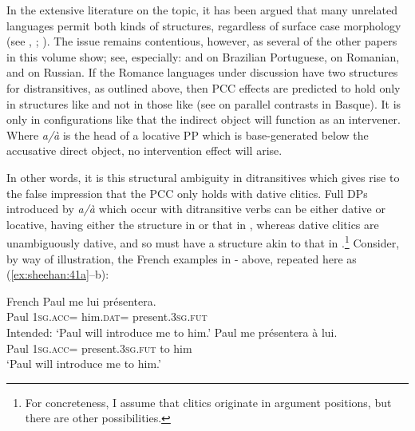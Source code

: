 \documentclass[output=paper,colorlinks,citecolor=brown,nonflat]{langsci/langscibook}
\begin{document}
In the extensive literature on the topic, it has been argued that many unrelated languages permit both kinds of structures, regardless of surface case morphology (see \citealt{Marantz1993, Pesetsky1995, Cuervo2003, Anagnostopoulou2003, Pylkkänen2002}, \citeyear{Pylkkänen2008}; \citealt{MiyagawaTsujioka2004, Bruening2010DOC, HarleyMiyagawa2017}). The issue remains contentious, however, as several of the other papers in this volume show; see, especially:  and  on Brazilian Portuguese,  on Romanian, and  on Russian. If the Romance languages under discussion have two structures for distransitives, as outlined above, then PCC effects are predicted to hold only in structures like  and not in those like  (see \citealt{Rezac2008} on parallel contrasts in Basque). It is only in configurations like  that the indirect object will function as an intervener. Where \textit{a/à} is the head of a locative PP which is base-generated below the accusative direct object, no intervention effect will arise.

In other words, it is this structural ambiguity in ditransitives which gives rise to the false impression that the PCC only holds with dative clitics. Full DPs introduced by \textit{a/à} which occur with ditransitive verbs can be either dative or locative, having either the structure in  or that in , whereas dative clitics are unambiguously dative, and so must have a structure akin to that in .\footnote{For concreteness, I assume that clitics originate in argument positions, but there are other possibilities.} Consider, by way of illustration, the French examples in - above, repeated here as (\ref{ex:sheehan:41a}--b):

\ea%
    \label{ex:sheehan:41}
    French \citep[173--174]{Kayne1975}
    \ea\label{ex:sheehan:41a}
    \gll    *Paul   me       lui       présentera.\\
            Paul   \textsc{1sg}.\textsc{acc}=   him.\textsc{dat=} present.\textsc{3sg.fut}\\
    \glt    Intended: ‘Paul will introduce me to him.’
    \ex\label{ex:sheehan:41b}
    \gll    Paul   me     présentera     à lui.\\
            Paul  \textsc{1sg}.\textsc{acc}=  present.\textsc{3sg.fut}   to him\\
    \glt    ‘Paul will introduce me to him.’
    \z
\z
\end{document}

